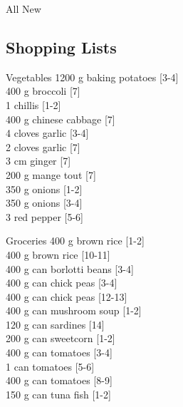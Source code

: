 \begin{menu}{All New}
    \subsection*{Shopping Lists}
      \begin{shoppinglist}{Vegetables}
      1200 g baking potatoes 
        {\scriptsize[3-4]}\\
      400 g broccoli 
        {\scriptsize[7]}\\
      1  chillis 
        {\scriptsize[1-2]}\\
      400 g chinese cabbage 
        {\scriptsize[7]}\\
      4 cloves garlic 
        {\scriptsize[3-4]}\\
      2 cloves garlic 
        {\scriptsize[7]}\\
      3 cm ginger 
        {\scriptsize[7]}\\
      200 g mange tout 
        {\scriptsize[7]}\\
      350 g onions 
        {\scriptsize[1-2]}\\
      350 g onions 
        {\scriptsize[3-4]}\\
      3  red pepper 
        {\scriptsize[5-6]}\\
      \end{shoppinglist}%
      \begin{shoppinglist}{Groceries}
      400 g brown rice 
        {\scriptsize[1-2]}\\
      400 g brown rice 
        {\scriptsize[10-11]}\\
      400 g can borlotti beans 
        {\scriptsize[3-4]}\\
      400 g can chick peas 
        {\scriptsize[3-4]}\\
      400 g can chick peas 
        {\scriptsize[12-13]}\\
      400 g can mushroom soup 
        {\scriptsize[1-2]}\\
      120 g can sardines 
        {\scriptsize[14]}\\
      200 g can sweetcorn 
        {\scriptsize[1-2]}\\
      400 g can tomatoes 
        {\scriptsize[3-4]}\\
      1  can tomatoes 
        {\scriptsize[5-6]}\\
      400 g can tomatoes 
        {\scriptsize[8-9]}\\
      150 g can tuna fish 
        {\scriptsize[1-2]}\\

\end{shoppinglist}
\end{menu}
